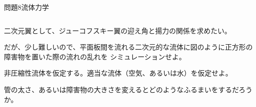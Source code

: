\documentclass[dvipdfmx]{beamer}
\newenvironment{wideitemize}{\itemize\setlength{\itemsep}{1em}}{\enditemize}
\newenvironment{wideitemize2}{\itemize\setlength{\itemsep}{0.2em}}{\enditemize}
\begin{document}

\begin{frame}{問題8}{流体力学}
\begin{columns}[t]
\begin{column}{0.7\textwidth}
\begin{wideitemize}
	\item 二次元翼として、ジューコフスキー翼の迎え角と揚力の関係を求めたい。
	\item だが、少し難しいので、平面板間を流れる二次元的な流体に図のように正方形の障害物を置いた際の流れの乱れを
	シミュレーションせよ。
	\begin{wideitemize2}
		\item 非圧縮性流体を仮定する。適当な流体（空気、あるいは水）を仮定せよ。
		\item 管の太さ、あるいは障害物の大きさを変えるとどのようなふるまいをするだろうか。
	\end{wideitemize2}
\end{wideitemize}


\end{column}
\end{columns}
\end{frame}
\end{document}
